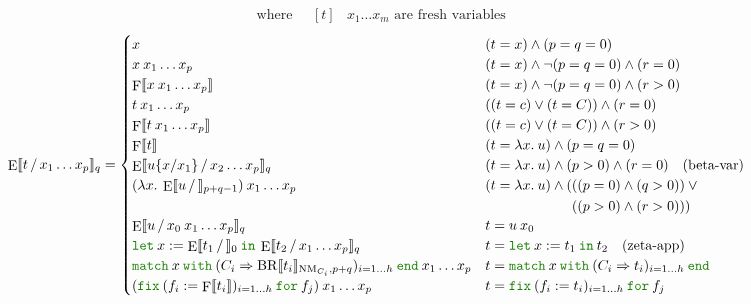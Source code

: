 \documentclass[a4paper,fleqn]{article}
\newcommand{\kwlet}{\mbox{\color{mygreen}\ttfamily let}}
\newcommand{\kwin}{\mbox{\color{mygreen}\ttfamily in}}
\newcommand{\kwmatch}{\mbox{\color{mygreen}\ttfamily match}}
\newcommand{\kwwith}{\mbox{\color{mygreen}\ttfamily with}}
\newcommand{\kwend}{\mbox{\color{mygreen}\ttfamily end}}
\newcommand{\kwfix}{\mbox{\color{mygreen}\ttfamily fix}}
\newcommand{\kwfor}{\mbox{\color{mygreen}\ttfamily for}}
\newcommand{\lam}[2]{\lambda #1.\:#2}
\newcommand{\letin}[3]{\kwlet\:#1:=#2\:\kwin\:#3}
\newcommand{\match}[4]{\kwmatch\:#1\:\kwwith\:(#2 \Rightarrow #3)_{#4}\:\kwend}
\newcommand{\fix}[4]{\kwfix\:(#1 := #2)_{#3}\:\kwfor\:#4}
\DeclareMathOperator{\NM}{NM}
\newcommand{\BRA}[1]{\llbracket #1 \rrbracket}
\DeclareMathOperator{\Fop}{F}
\newcommand{\F}[1]{\Fop\BRA{#1}}
\DeclareMathOperator{\BRop}{BR}
\newcommand{\BR}[3]{\BRop\BRA{#1}_{#2,#3}}
\DeclareMathOperator{\Eop}{E}
\newcommand{\E}[3]{\Eop\BRA{#1\,/\,#2}_{#3}}
\newcommand{\subst}[3]{#1\{#2/#3\}}
\begin{document}
\[ \quad\text{where} \quad
  \begin{aligned}[t]
    & \text{$x_1\ldots x_m$ are fresh variables}
  \end{aligned}
\]
\[
  \E{t}{x_1\ldots x_p}{q} =
  \begin{cases}
    x                                                                                                 & (t = x) \wedge (p = q = 0) \\
    x\:x_1\ldots x_p                                                                                    & (t = x) \wedge \neg (p = q = 0) \wedge (r = 0) \\
    \F{x\:x_1\ldots x_p}                                                                                 & (t = x) \wedge \neg (p = q = 0) \wedge (r > 0) \\
    t\:x_1\ldots x_p                                                                                    & ((t = c) \vee (t = C)) \wedge (r = 0) \\
    \F{t\:x_1\ldots x_p}                                                                                 & ((t = c) \vee (t = C)) \wedge (r > 0) \\
    \F{t}                                                                                              & (t = \lam{x}{u}) \wedge (p = q = 0) \\
    \E{\subst{u}{x}{x_1}}{x_2\ldots x_p}{q}                                                             & (t = \lam{x}{u}) \wedge (p > 0) \wedge (r = 0) \quad \text{(beta-var)} \\
    (\lam{x}{\E{u}{}{p+q-1}})\:x_1\ldots x_p                                                             & (t = \lam{x}{u}) \wedge (\begin{aligned}[t]
                                                                                                                                & ((p = 0) \wedge (q > 0)) \vee {} \\
                                                                                                                                & ((p > 0) \wedge (r > 0)))
                                                                                                                                \end{aligned} \\
    \E{u}{x_0\:x_1\ldots x_p}{q}                                                                & t = u\:x_0 \\
    \letin{x}{\E{t_1}{}{0}}{\E{t_2}{x_1\ldots x_p}{q}}                                                            & t = \letin{x}{t_1}{t_2} \quad \text{(zeta-app)} \\
    \match{x}{C_i}{\BR{t_i}{\NM_{C_i}}{p+q}}{i=1\ldots h}\:x_1\ldots x_p                                   & t = \match{x}{C_i}{t_i}{i=1\ldots h} \\
    (\fix{f_i}{\F{t_i}}{i=1\ldots h}{f_j})\:x_1\ldots x_p                                             & t = \fix{f_i}{t_i}{i=1\ldots h}{f_j}
  \end{cases}
\]
\end{document}
